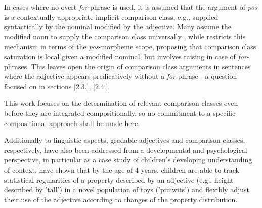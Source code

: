In cases where no overt \textit{for}-phrase is used, it is assumed that the argument of \textit{pos} is a contextually appropriate implicit comparison class, e.g., supplied syntactically by the nominal modified by the adjective. Many assume the modified noun to supply the comparison class universally \parencite[cf. e.g. ][]{Cresswell1976, Kamp1975, Heim2000}, while \textcite{Solt2009} restricts this mechanism in terms of the \textit{pos}-morpheme scope, proposing that comparison class saturation is local given a modified nominal, but involves raising in case of \textit{for}-phrases. This leaves open the origin of comparison class arguments in sentences where the adjective appears predicatively without a \textit{for}-phrase - a question focused on in sections \ref{2.3.}, \ref{2.4.}. 

This work focuses on the determination of relevant comparison classes even before they are integrated compositionally, so no commitment to a specific compositional approach shall be made here. 

Additionally to linguistic aspects, gradable adjectives and comparison classes, respectively, have also been addressed from a developmental and psychological perspective, in particular as a case study of children's developing understanding of context. 
\textcite{barner2008} have shown that by the age of 4 years, children are able to track statistical regularities of a property described by an adjective (e.g., height described by 'tall') in a novel population of toys ('pimwits') and flexibly adjust their use of the adjective according to changes of the property distribution. 
 
